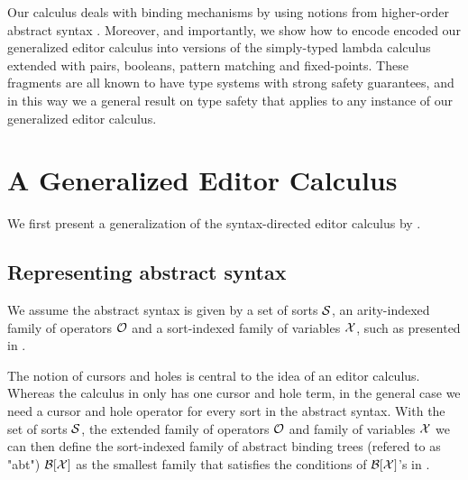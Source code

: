 \documentclass[sigplan,anonymous,review]{acmart}
\begin{document}
Our calculus deals with binding mechanisms by using notions from
higher-order abstract syntax \cite{hoas}. Moreover, and importantly,
we show how to encode encoded our generalized editor calculus into
versions of the simply-typed lambda calculus extended with pairs,
booleans, pattern matching and fixed-points. These fragments are all
known to have type systems with strong safety guarantees, and in this
way we a general result on type safety that applies to any instance of
our generalized editor calculus.

\section{A Generalized Editor Calculus}\label{sec:general_editor}

We first present a generalization of the syntax-directed editor
calculus by \cite{type_safe_structure_editor}.

\subsection{Representing abstract syntax}

We assume the abstract syntax is given by a set of sorts $\mathcal{S}$, an arity-indexed family of operators $\mathcal{O}$ and a sort-indexed family of variables $\mathcal{X}$, such as presented in \cite{harper_foundations}.  

The notion of cursors and holes is central to the idea of an editor
calculus. Whereas the calculus in \cite{type_safe_structure_editor}
only has one cursor and hole term, in the general case we need a
cursor and hole operator for every sort in the abstract syntax.  With
the set of sorts $\mathcal{S}$, the extended family of operators $\mathcal{O}$ and
family of variables $\mathcal{X}$ we can then define the sort-indexed family
of abstract binding trees (refered to as "abt") $\mathcal{B}[\mathcal{X} ]$ as the
smallest family that satisfies the conditions of $\mathcal{B}[\mathcal{X} ]$'s in
\cite{harper_foundations}.
\end{document}

